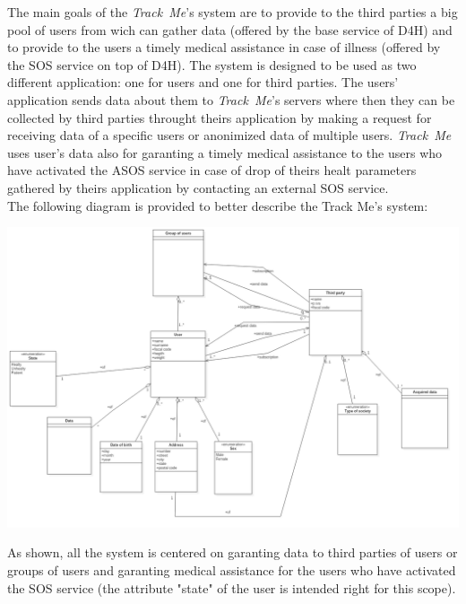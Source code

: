 The main goals of the \hbox{\emph{Track Me}}'s system are to provide to the third parties a big pool of users from wich can gather data (offered by the base service of D4H) and to provide to the users a timely medical  assistance in case of illness (offered by the SOS service on top of D4H). The system is designed to be used as two different application: one for users and one for third parties. The users' application sends data about them to \hbox{\emph{Track Me}}'s servers where then they can be collected by third parties throught theirs application by making a request for receiving data of a specific users or anonimized data of multiple users. \hbox{\emph{Track Me}} uses user's data also for garanting a timely medical assistance to the users who have activated the ASOS service in case of drop of theirs healt parameters gathered by theirs application by contacting an external SOS service.\\

The following diagram is provided to better describe the Track Me's system:

\includegraphics[width=1.00\textwidth]{./pictures/uml_v1.png}\par

As shown, all the system is centered on garanting data to third parties of users or groups of users and garanting medical assistance for the users who have activated the SOS service (the attribute "state" of the user is intended right for this scope).
